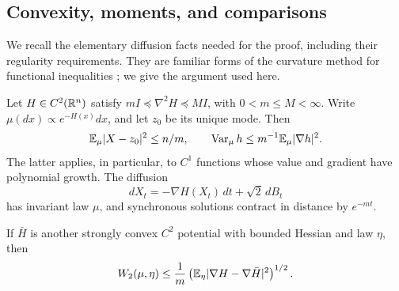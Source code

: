 \subsection{Convexity, moments, and comparisons}

We recall the elementary diffusion facts needed for the proof,
including their regularity requirements. They are familiar forms
of the curvature method for functional inequalities
\citep{bakry2014analysis}; we give the argument used here.

\begin{lemma}\label{lem:convex-preliminaries}
Let \(H\in C^2(\mathbb R^n)\) satisfy
\(mI\preceq\nabla^2H\preceq MI\), with \(0<m\le M<\infty\).
Write \(\mu(dx)\propto e^{-H(x)}dx\), and let \(z_0\) be
its unique mode. Then
\[
 \mathbb E_\mu|X-z_0|^2\le n/m,\qquad
 \operatorname{Var}_\mu h\le m^{-1}\mathbb E_\mu|\nabla h|^2.
\]
The latter applies, in particular, to \(C^1\) functions whose
value and gradient have polynomial growth.
The diffusion
\[
                  dX_t=-\nabla H(X_t)\,dt+\sqrt2\,dB_t
\]
has invariant law \(\mu\), and synchronous solutions contract
in distance by \(e^{-mt}\).

If \(\bar H\) is another strongly convex \(C^2\) potential
with bounded Hessian and law \(\eta\), then
\begin{equation}\label{eq:synchronous-comparison}
 W_2(\mu,\eta)
 \le \frac1m
       \left(\mathbb E_\eta|\nabla H-\nabla\bar H|^2\right)^{1/2}.
\end{equation}
\end{lemma}

